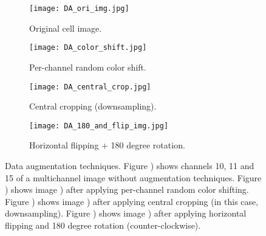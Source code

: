 \begin{figure}[htb]
  \centering
  \begin{subfigure}[b]{.35\linewidth}
    \texttt{[image: DA\_ori\_img.jpg]}
    \caption{Original cell image.}
    \label{fig:dataset:da:ori}
  \end{subfigure}
  \begin{subfigure}[b]{.35\linewidth}
    \texttt{[image: DA\_color\_shift.jpg]}
    \caption{Per-channel random color shift.}
    \label{fig:dataset:da:color_shift}
  \end{subfigure}%
  \vspace{3mm}
  \begin{subfigure}[b]{.35\linewidth}
    \texttt{[image: DA\_central\_crop.jpg]}
    \caption{Central cropping (downsampling).}
    \label{fig:dataset:da:central_crop}
  \end{subfigure}
  \begin{subfigure}[b]{.35\linewidth}
    \texttt{[image: DA\_180\_and\_flip\_img.jpg]}
    \caption{Horizontal flipping + 180 degree rotation.}
    \label{fig:dataset:da:rf}
  \end{subfigure}
  \caption{Data augmentation techniques. Figure ) shows channels 10, 11 and 15 of a multichannel image without augmentation techniques. Figure ) shows image ) after applying per-channel random color shifting. Figure ) shows image ) after applying central cropping (in this case, downsampling). Figure ) shows image ) after applying horizontal flipping and 180 degree rotation (counter-clockwise).}
  \label{fig:dataset:da}
\end{figure}
